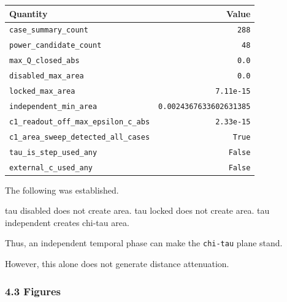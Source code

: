 \documentclass[
]{article}
\newenvironment{Shaded}{}{}
\newcommand{\NormalTok}[1]{#1}
\newcounter{none} %
\begin{document}
{\def\LTcaptype{none} %
\begin{longtable}[]{@{}lr@{}}
\toprule\noalign{}
Quantity & Value \\
\midrule\noalign{}
\endhead
\bottomrule\noalign{}
\endlastfoot
\texttt{case\_summary\_count} & \texttt{288} \\
\texttt{power\_candidate\_count} & \texttt{48} \\
\texttt{max\_Q\_closed\_abs} & \texttt{0.0} \\
\texttt{disabled\_max\_area} & \texttt{0.0} \\
\texttt{locked\_max\_area} & \texttt{7.11e-15} \\
\texttt{independent\_min\_area} & \texttt{0.0024367633602631385} \\
\texttt{c1\_readout\_off\_max\_epsilon\_c\_abs} & \texttt{2.33e-15} \\
\texttt{c1\_area\_sweep\_detected\_all\_cases} & \texttt{True} \\
\texttt{tau\_is\_step\_used\_any} & \texttt{False} \\
\texttt{external\_c\_used\_any} & \texttt{False} \\
\end{longtable}
}

The following was established.

\begin{Shaded}
\begin{Highlighting}[]
\NormalTok{tau disabled does not create area.}
\NormalTok{tau locked does not create area.}
\NormalTok{tau independent creates chi{-}tau area.}
\end{Highlighting}
\end{Shaded}

Thus, an independent temporal phase can make the \texttt{chi-tau} plane
stand.

However, this alone does not generate distance attenuation.

\subsubsection{4.3 Figures}\label{figures-1}
\end{document}
